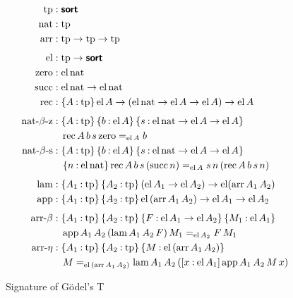 \documentclass[11pt,twoside]{article}
\newcommand{\braces}[1]{\{#1\}}
\newcommand{\bracks}[1]{[#1]}
\newcommand{\parens}[1]{(#1)}
\newcommand{\sortclass}{\ensuremath{\textbf{\textsf{sort}}}}
\newcommand{\eqclass}[3]{{#2}=_{#1}{#3}}
\newcommand{\piclass}[3]{\braces{{#2}\mathbin{:}{#1}}\,{#3}}
\newcommand{\arrclass}[2]{{#1}\to{#2}}
\newcommand{\lamobj}[3]{\bracks{{#2}\mathbin{:}{#1}}\,{#3}}
\newcommand{\appobj}[2]{{#1}\,{#2}}
\begin{document}
\begin{figure}
  
  \begin{align*}
    \tpsort
    & : \sortclass \\
    \nattp
    & : \tpsort \\
    \arrtp
    & : \arrclass{\tpsort}{\arrclass{\tpsort}{\tpsort}} \\[1ex]
    \elfam
%
    & : \arrclass{\tpsort}{\sortclass} \\
    \zerocon
    & : \elof{\nattp} \\
    \succcon
    & : \arrclass {\elof{\nattp}}{\elof{\nattp}} \\
    \reccon
    &  :
      \piclass{\tpsort}{A}{
      \arrclass{\elof{A}}{
      \arrclass{\parens{\arrclass{\elof{\nattp}}{\arrclass{\elof{A}}{\elof{A}}}}}{
      \elof{A}}}} \\[1ex] 
%
    \reczcon
    & :
      \piclass{\tpsort}{A}{
      \piclass{\elof{A}}{b}{
      \piclass{\arrclass{\elof{\nattp}}{\arrclass{\elof{A}}{\elof{A}}}}{s}{
      }}} \\
    & \quad
      \eqclass{\elof{A}}{\recof{A}{b}{s}{\zerocon}}{b} \\
    \recscon
    & :
      \piclass{\tpsort}{A}{
      \piclass{\elof{A}}{b}{
      \piclass{\arrclass{\elof{\nattp}}{\arrclass{\elof{A}}{\elof{A}}}}{s}{
      }}} \\
    & \quad
      \piclass{\elof{\nattp}}{n}{
      \eqclass{\elof{A}}
      {\recof{A}{b}{s}{\parens{\succof{n}}}}
      {\appobj{\appobj{s}{n}}{\parens{\recof{A}{b}{s}{n}}}}} \\[1ex]
%
    \lamcon
    & :
      \piclass{\tpsort}{A_{1}}{
      \piclass{\tpsort}{A_{2}}{
      \arrclass{\parens{\arrclass{\elof{A_{1}}}{\elof{A_{2}}}}}{
      \elfam{\parens{\arrof{A_{1}}{A_{2}}}}}}} \\
    \appcon
    & :
      \piclass{\tpsort}{A_{1}}{
      \piclass{\tpsort}{A_{2}}{
      \arrclass{\elofp{\arrof{A_{1}}{A_{2}}}}{
      \arrclass{\elof{A_{1}}}{\elof{A_{2}}}}}} \\[1ex]
%
    \betacon
    & :
      \piclass{\tpsort}{A_{1}}{
      \piclass{\tpsort}{A_{2}}{
      \piclass{\arrclass{\elof{A_{1}}}{\elof{A_{2}}}}{F}{
      \piclass{\elof{A_{1}}}{M_1}{
      }}}} \\
    & \quad
      \eqclass{\elof{A_{2}}}
      {\appof{A_{1}}{A_{2}}{\parens{\lamof{A_{1}}{A_{2}}{F}}}{M_1}}
      {\appobj{F}{M_1}} \\
    \etacon
    & :
      \piclass{\tpsort}{A_{1}}{
      \piclass{\tpsort}{A_{2}}{
      \piclass{\elofp{\arrof{A_{1}}{A_{2}}}}{M}{
      }}} \\
    & \quad
      \eqclass{\elofp{\arrof{A_{1}}{A_{2}}}}
      {M}
      {\lamof{A_{1}}{A_{2}}{\parens{\lamobj{\elof{A_{1}}}{x}{\appof{A_{1}}{A_{2}}{M}{x}}}}}
  \end{align*}

  \caption{Signature of G\"odel's T}
  \label{fig:t-sig}
\end{figure}
\end{document}
